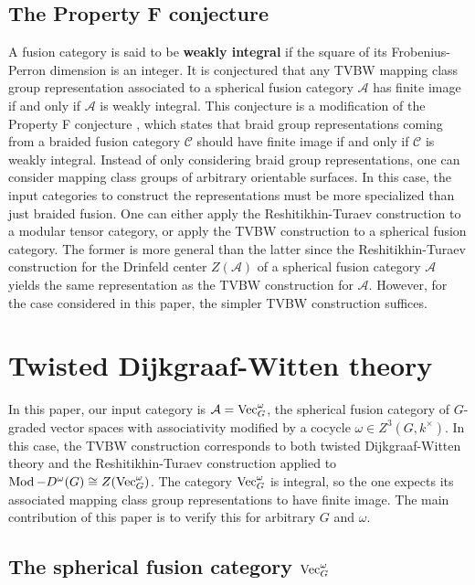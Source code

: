\subsection{The Property F conjecture}
A fusion category is said to be \textbf{weakly integral} if the square of its Frobenius-Perron dimension is an integer.  It is conjectured that any TVBW mapping class group representation associated to a spherical fusion category $\mathcal A$ has finite image if and only if  $\mathcal A$ is weakly integral.  This conjecture is a modification of the Property F conjecture \cite{erw, nr}, which states that braid group representations coming from a braided fusion category $\mathcal C$ should have finite image if and only if $\mathcal C$ is weakly integral. Instead of only considering braid group representations, one can consider mapping class groups of arbitrary orientable surfaces.  In this case, the input categories to construct the representations must be more specialized than just braided fusion.  One can either apply the Reshitikhin-Turaev construction to a modular tensor category, or apply the TVBW construction to a spherical fusion category.  The former is more general than the latter since the Reshitikhin-Turaev construction for the Drinfeld center $Z(\mathcal A)$ of a spherical fusion category $\mathcal A$ yields the same representation as the TVBW construction for $\mathcal A$.  However, for the case considered in this paper, the simpler TVBW construction suffices.

\section{Twisted Dijkgraaf-Witten theory}

In this paper, our input category is  $\mathcal A = \operatorname{Vec}_G^\omega$, the spherical fusion category of $G$-graded vector spaces with associativity modified by a cocycle $\omega \in Z^3(G, k^\times)$.  In this case, the TVBW construction corresponds to both twisted Dijkgraaf-Witten theory \cite{dijkgraaf1990} and the Reshitikhin-Turaev construction \cite{reshetikhin1991invariants} applied to $\operatorname{Mod}-D^\omega(G) \cong Z(\operatorname{Vec}_G^\omega)$.  The category $\operatorname{Vec}_G^\omega$ is integral, so the one expects its associated mapping class group representations to have finite image.  The main contribution of this paper is to verify this for arbitrary $G$ and $\omega$.


\subsection{The spherical fusion category $\operatorname{Vec}_G^\omega$}



